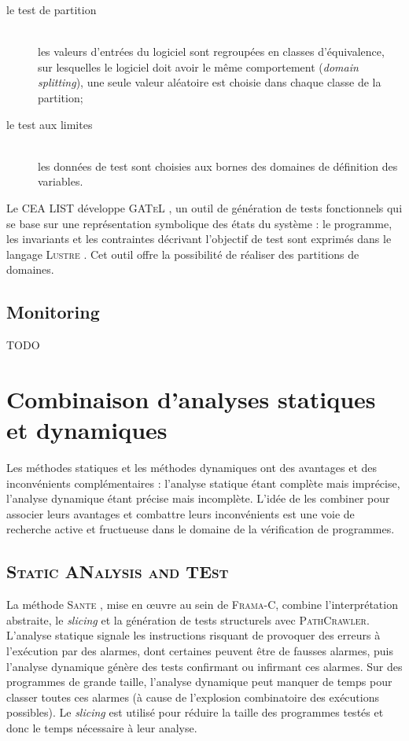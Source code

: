 \documentclass[french]{spimufcphdthesis}
\begin{document}
\begin{description}
\item[le test de partition] \hfill \\
les valeurs d’entrées du logiciel sont regroupées en classes d’équivalence, sur
lesquelles le logiciel doit avoir le même comportement ({\em domain splitting}),
une seule valeur aléatoire est choisie dans chaque classe de la partition;
\item[le test aux limites] \hfill \\
les données de test sont choisies aux bornes des domaines de définition des
variables.
\end{description}

Le CEA LIST développe \textsc{GATeL} \cite{GATEL}, un outil de génération de
tests fonctionnels qui se base sur une représentation symbolique des états du
système : le programme, les invariants et les contraintes décrivant l'objectif
de test sont exprimés dans le langage \textsc{Lustre} \cite{Lustre}. Cet outil
offre la possibilité de réaliser des partitions de domaines.



\subsection{Monitoring}
\label{sec:monitoring}


TODO


\section{Combinaison d'analyses statiques et dynamiques}
\label{sec:combinaison}

Les méthodes statiques et les méthodes dynamiques ont des avantages et des
inconvénients complémentaires : l'analyse statique étant complète mais
imprécise, l'analyse dynamique étant précise mais incomplète. L’idée de les
combiner pour associer leurs avantages et combattre leurs inconvénients
\cite{duality} est une voie de recherche active et fructueuse dans le domaine de
la vérification de programmes.


\subsection{\textsc{Static ANalysis and TEst}}

La méthode \textsc{Sante} \cite{TheseOmar, SANTE}, mise en \oe{}uvre au sein de
\textsc{Frama-C}, combine l'interprétation abstraite, le {\em slicing} et la
génération de tests structurels avec \textsc{PathCrawler}. L’analyse statique
signale les instructions risquant de provoquer des erreurs à l’exécution par des
alarmes, dont certaines peuvent être de fausses alarmes, puis l’analyse
dynamique génère des tests confirmant ou infirmant ces alarmes. Sur des
programmes de grande taille, l'analyse dynamique peut manquer de temps pour
classer toutes ces alarmes (à cause de l'explosion combinatoire des exécutions
possibles). Le {\em slicing} est utilisé pour réduire la taille des programmes
testés et donc le temps nécessaire à leur analyse.
\end{document}
